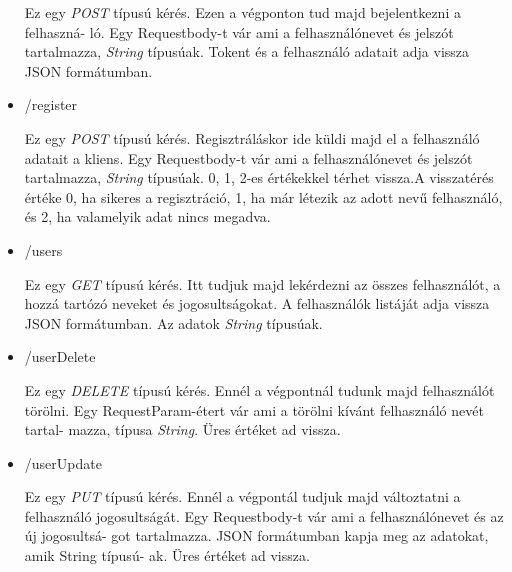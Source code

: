 \begin{itemize}
Ez egy \textit{POST} típusú kérés. Ezen a végponton tud majd bejelentkezni a felhaszná-
ló.
Egy Requestbody-t vár ami a felhasználónevet és jelszót tartalmazza, \textit{String} típusúak. Tokent és a felhasználó adatait adja vissza JSON formátumban.
\item /register

Ez egy \textit{POST} típusú kérés. Regisztráláskor ide küldi majd el a felhasználó adatait a kliens.
Egy Requestbody-t vár ami a felhasználónevet és jelszót tartalmazza, \textit{String} típusúak. 0, 1, 2-es értékekkel térhet vissza.A visszatérés értéke 0, ha sikeres a regisztráció, 1, ha már létezik az adott nevű felhasználó, és 2, ha valamelyik adat nincs megadva.  
\item /users

Ez egy \textit{GET} típusú kérés. Itt tudjuk majd lekérdezni az összes felhasználót, a hozzá tartózó neveket és jogosultságokat.
A felhasználók listáját adja vissza JSON formátumban. Az adatok \textit{String} típusúak.
\item /userDelete

Ez egy \textit{DELETE} típusú kérés. Ennél a végpontnál tudunk majd felhasználót törölni.
Egy RequestParam-étert vár ami a törölni kívánt felhasználó nevét tartal-
mazza, típusa \textit{String}. Üres értéket ad vissza.
\item /userUpdate

Ez egy \textit{PUT} típusú kérés. Ennél  a végpontál tudjuk majd változtatni a felhasználó jogosultságát.
Egy Requestbody-t vár ami a felhasználónevet és az új jogosultsá-
got tartalmazza. JSON formátumban kapja meg az adatokat, amik String típusú-
ak. Üres értéket ad vissza.

\end{itemize}









